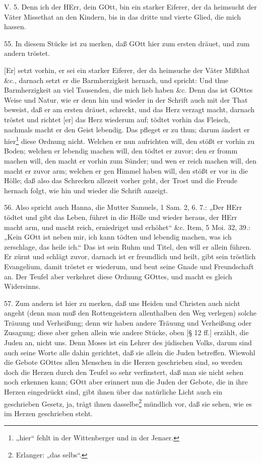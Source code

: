 \begin{schriftzitat}
V. 5. Denn ich der HErr, dein GOtt, bin ein starker Eiferer, der da heimsucht der Väter Missethat an den Kindern, bis in das dritte und vierte Glied, die mich hassen.
\end{schriftzitat}

55. In diesem Stücke ist zu merken, daß GOtt hier zum ersten dräuet, und zum andern tröstet.

[Er] setzt vorhin, er sei ein starker Eiferer, der da heimsuche der Väter Mißthat \&c., darnach setzt er die Barmherzigkeit hernach, und spricht: Und thue Barmherzigkeit an viel Tausenden, die mich lieb haben \&c. Denn das ist GOttes Weise und Natur, wie er denn hin und wieder in der Schrift auch mit der That beweist, daß er am ersten dräuet, schreckt, und das Herz verzagt macht, darnach tröstet und richtet [er] das Herz wiederum auf; tödtet vorhin das Fleisch, nachmals macht er den Geist lebendig. Das pfleget er zu thun; darum ändert er hier\footnote{„hier“ fehlt in der Wittenberger und in der Jenaer.} diese Ordnung nicht. Welchen er nun aufrichten will, den stößt er vorhin zu Boden; welchen er lebendig machen will, den tödtet er zuvor; den er fromm machen will, den macht er vorhin zum Sünder; und wen er reich machen will, den macht er zuvor arm; welchen er gen Himmel haben will, den stößt er vor in die Hölle; daß also das Schrecken allezeit vorher geht, der Trost und die Freude hernach folgt, wie hin und wieder die Schrift anzeigt.

56. Also spricht auch Hanna, die Mutter Samuels, 1 Sam. 2, 6. 7.: „Der HErr tödtet und gibt das Leben, führet in die Hölle und wieder heraus, der HErr macht arm, und macht reich, erniedriget und erhöhet“ \&c. Item, 5 Moi. 32, 39.: „Kein GOtt ist neben mir, ich kann tödten und lebendig machen, was ich zerschlage, das heile ich.“ Das ist sein Ruhm und Titel, den will er allein führen. Er zürnt und schlägt zuvor, darnach ist er freundlich und heilt, gibt sein tröstlich Evangelium, damit tröstet er wiederum, und beut seine Gnade und Freundschaft an. Der Teufel aber verkehret diese Ordnung GOttes, und macht es gleich Widersinns.

57. Zum andern ist hier zu merken, daß uns Heiden und Christen auch nicht angeht (denn man muß den Rottengeistern allenthalben den Weg verlegen) solche Träuung und Verheißung; denn wir haben andere Träuung und Verheißung oder Zusagung; diese aber gehen allein wie andere Stücke, oben [§ 12 ff.] erzählt, die Juden an, nicht uns. Denn Moses ist ein Lehrer des jüdischen Volks, darum sind auch seine Worte alle dahin gerichtet, daß sie allein die Juden betreffen. Wiewohl die Gebote GOttes allen Menschen in die Herzen geschrieben sind, so werden doch die Herzen durch den Teufel so sehr verfinstert, daß man sie nicht sehen noch erkennen kann; GOtt aber erinnert nun die Juden der Gebote, die in ihre Herzen eingedrückt sind, gibt ihnen über das natürliche Licht auch ein geschrieben Gesetz, ja, trägt ihnen dasselbe\footnote{Erlanger: „das selbs“.} mündlich vor, daß sie sehen, wie es im Herzen geschrieben steht.


